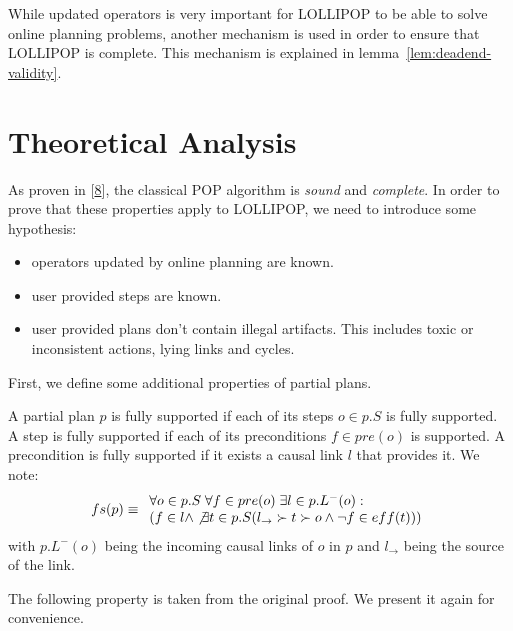 While updated operators is very important for LOLLIPOP to be able to
solve online planning problems, another mechanism is used in order to
ensure that LOLLIPOP is complete. This mechanism is explained in
lemma~\ref{lem:deadend-validity}.

\section{Theoretical Analysis}\label{sec:analysis}

As proven in
{[}\protect\hyperlink{ref-penberthyux5fucpopux5f1992}{8}{]}, the
classical POP algorithm is \emph{sound} and \emph{complete}. In order to
prove that these properties apply to LOLLIPOP, we need to introduce some
hypothesis:

\begin{itemize}
\tightlist
\item
  operators updated by online planning are known.
\item
  user provided steps are known.
\item
  user provided plans don't contain illegal artifacts. This includes
  toxic or inconsistent actions, lying links and cycles.
\end{itemize}

First, we define some additional properties of partial plans.

\begin{definition}\label{def:fullsupport}

A partial plan \(p\) is fully supported if each of its steps
\(o \in p.S\) is fully supported. A step is fully supported if each of
its preconditions \(f \in pre(o)\) is supported. A precondition is fully
supported if it exists a causal link \(l\) that provides it. We note:
\[fs(p) \equiv
\begin{array}{l}
    \forall o \in p.S \thickspace \forall f \in pre(o) \thickspace \exists l \in p.L^-(o): \\
        \left(f \in l \land \not \exists t \in p.S (l_{\rightarrow} \succ t \succ o \land \lnot f \in eff(t))\right)
\end{array}\] with \(p.L^-(o)\) being the incoming causal links of \(o\)
in \(p\) and \(l_{\rightarrow}\) being the source of the link.

\end{definition}

The following property is taken from the original proof. We present it
again for convenience.


